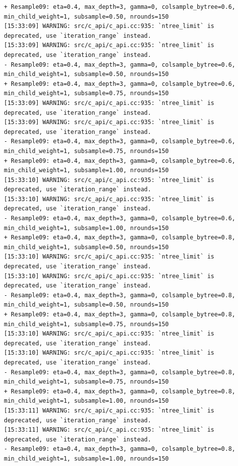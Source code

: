 \documentclass[
  letterpaper,
  DIV=11,
  numbers=noendperiod]{scrartcl}
\begin{document}
\begin{verbatim}
+ Resample09: eta=0.4, max_depth=3, gamma=0, colsample_bytree=0.6, min_child_weight=1, subsample=0.50, nrounds=150 
[15:33:09] WARNING: src/c_api/c_api.cc:935: `ntree_limit` is deprecated, use `iteration_range` instead.
[15:33:09] WARNING: src/c_api/c_api.cc:935: `ntree_limit` is deprecated, use `iteration_range` instead.
- Resample09: eta=0.4, max_depth=3, gamma=0, colsample_bytree=0.6, min_child_weight=1, subsample=0.50, nrounds=150 
+ Resample09: eta=0.4, max_depth=3, gamma=0, colsample_bytree=0.6, min_child_weight=1, subsample=0.75, nrounds=150 
[15:33:09] WARNING: src/c_api/c_api.cc:935: `ntree_limit` is deprecated, use `iteration_range` instead.
[15:33:09] WARNING: src/c_api/c_api.cc:935: `ntree_limit` is deprecated, use `iteration_range` instead.
- Resample09: eta=0.4, max_depth=3, gamma=0, colsample_bytree=0.6, min_child_weight=1, subsample=0.75, nrounds=150 
+ Resample09: eta=0.4, max_depth=3, gamma=0, colsample_bytree=0.6, min_child_weight=1, subsample=1.00, nrounds=150 
[15:33:10] WARNING: src/c_api/c_api.cc:935: `ntree_limit` is deprecated, use `iteration_range` instead.
[15:33:10] WARNING: src/c_api/c_api.cc:935: `ntree_limit` is deprecated, use `iteration_range` instead.
- Resample09: eta=0.4, max_depth=3, gamma=0, colsample_bytree=0.6, min_child_weight=1, subsample=1.00, nrounds=150 
+ Resample09: eta=0.4, max_depth=3, gamma=0, colsample_bytree=0.8, min_child_weight=1, subsample=0.50, nrounds=150 
[15:33:10] WARNING: src/c_api/c_api.cc:935: `ntree_limit` is deprecated, use `iteration_range` instead.
[15:33:10] WARNING: src/c_api/c_api.cc:935: `ntree_limit` is deprecated, use `iteration_range` instead.
- Resample09: eta=0.4, max_depth=3, gamma=0, colsample_bytree=0.8, min_child_weight=1, subsample=0.50, nrounds=150 
+ Resample09: eta=0.4, max_depth=3, gamma=0, colsample_bytree=0.8, min_child_weight=1, subsample=0.75, nrounds=150 
[15:33:10] WARNING: src/c_api/c_api.cc:935: `ntree_limit` is deprecated, use `iteration_range` instead.
[15:33:10] WARNING: src/c_api/c_api.cc:935: `ntree_limit` is deprecated, use `iteration_range` instead.
- Resample09: eta=0.4, max_depth=3, gamma=0, colsample_bytree=0.8, min_child_weight=1, subsample=0.75, nrounds=150 
+ Resample09: eta=0.4, max_depth=3, gamma=0, colsample_bytree=0.8, min_child_weight=1, subsample=1.00, nrounds=150 
[15:33:11] WARNING: src/c_api/c_api.cc:935: `ntree_limit` is deprecated, use `iteration_range` instead.
[15:33:11] WARNING: src/c_api/c_api.cc:935: `ntree_limit` is deprecated, use `iteration_range` instead.
- Resample09: eta=0.4, max_depth=3, gamma=0, colsample_bytree=0.8, min_child_weight=1, subsample=1.00, nrounds=150 

\end{verbatim}
\end{document}
